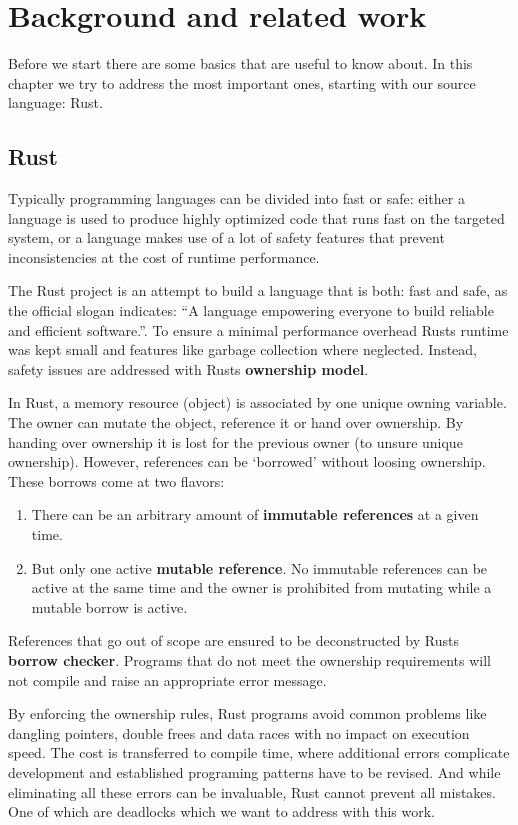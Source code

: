 \chapter{Background and related work}
Before we start there are some basics that are useful to know about.
In this chapter we try to address the most important ones, starting with our source language: Rust.
\section{Rust}
\label{rel_rust}
Typically programming languages can be divided into fast or safe: 
either a language is used to produce highly optimized code that runs fast on the targeted system,
or a language makes use of a lot of safety features that prevent inconsistencies at the cost of runtime performance.

The Rust project is an attempt to build a language that is both: fast and safe, 
as the official slogan indicates: ``A language empowering everyone
to build reliable and efficient software.''\cite{rustSite}.
To ensure a minimal performance overhead Rusts runtime was kept small\cite[Chapter 16.1]{klabnik2018rust} and features like garbage collection where neglected\cite[Chapter 4]{klabnik2018rust}.
Instead, safety issues are addressed with Rusts \textbf{ownership model}\cite{Matsakis:2014:RL:2692956.2663188}.

In Rust, a memory resource (object) is associated by one unique owning variable.
The owner can mutate the object, reference it or hand over ownership.
By handing over ownership it is lost for the previous owner (to unsure unique ownership).
However, references can be `borrowed' without loosing ownership.
These borrows come at two flavors:
\begin{enumerate}
  \item There can be an arbitrary amount of \textbf{immutable references} at a given time.
  \item But only one active \textbf{mutable reference}. 
  No immutable references can be active at the same time and the owner is prohibited from mutating while a mutable borrow is active.
\end{enumerate}
References that go out of scope are ensured to be deconstructed by Rusts \textbf{borrow checker}. 
Programs that do not meet the ownership requirements will not compile and raise an appropriate error message.

By enforcing the ownership rules, Rust programs avoid common problems like dangling pointers, double frees and data races\cite{Matsakis:2014:RL:2692956.2663188} with no impact on execution speed.
The cost is transferred to compile time, where additional errors complicate development and established programing patterns have to be revised.
And while eliminating all these errors can be invaluable, Rust cannot prevent all mistakes.
One of which are deadlocks\cite[Chapter 8.1]{nomicon} which we want to address with this work.


